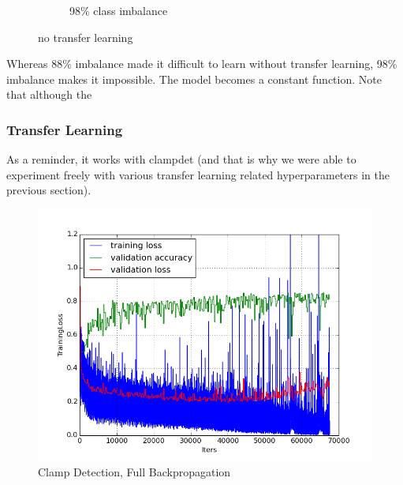\documentclass[a4paper,11pt]{article}
\begin{document}
\begin{figure}
\begin{minipage}[b]{\textwidth}
\begin{subfigure}{.5\textwidth}
        \caption{98\% class imbalance}\label{fig:2b}
      \end{subfigure} \par \vspace*{20pt} %
      \caption{no transfer learning}\label{fig:2}
    \end{minipage}%
\end{figure}

Whereas 88\% imbalance made it difficult to learn without transfer learning, 98\% imbalance makes it impossible. The model becomes a constant function. Note that although the 

\subsubsection{Transfer Learning}

As a reminder, it works with clampdet (and that is why we were able to experiment freely with various transfer learning related hyperparameters in the previous section).

\begin{figure}[h!]
	\centering
	\includegraphics[scale=0.5]{images/plot_clampdet_tl_wout.png}
	\caption{Clamp Detection, Full Backpropagation}
\end{figure}
\end{document}
